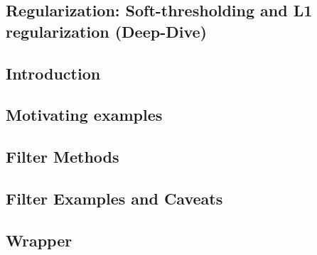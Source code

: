 \documentclass[13pt,compress]{beamer}
\begin{document}
\subsection{Regularization: Soft-thresholding and L1 regularization (Deep-Dive)}





\subsection{Introduction}


\subsection{Motivating examples}


\subsection{Filter Methods}


\subsection{Filter Examples and Caveats}


\subsection{Wrapper}

\end{document}
